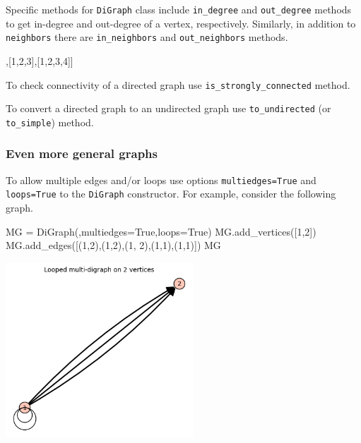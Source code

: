 Specific methods for \verb|DiGraph| class include \verb|in_degree| and \verb|out_degree| methods to get in-degree and out-degree of a vertex, respectively.  Similarly, in addition to \verb|neighbors| there are \verb|in_neighbors| and \verb|out_neighbors| methods.
\begin{sageCell}
\end{sageCell}
\begin{outCell}
    [1,3,4]
\end{outCell}
\begin{sageCell}
\end{sageCell}
\begin{outCell}
    [[4],[1,2,3],[1,2,3,4]]
\end{outCell}
To check connectivity of a directed graph use \verb|is_strongly_connected| method.
\begin{sageCell}
\end{sageCell}
\begin{outCell}
\end{outCell}
To convert a directed graph to an undirected graph use \verb|to_undirected| (or \verb|to_simple|) method.

\subsubsection*{Even more general graphs}

To allow multiple edges and/or loops use options \verb|multiedges=True| and \verb|loops=True| to the \verb|DiGraph| constructor. For example, consider the following graph.
\begin{sageCell}
    MG = DiGraph({},multiedges=True,loops=True)
    MG.add_vertices([1,2])
    MG.add_edges([(1,2),(1,2),(1, 2),(1,1),(1,1)])
    MG
\end{sageCell}
\begin{outImage}
    \includegraphics[width=7cm]{Images/Introduction/output_multigraph.png}
\end{outImage}

